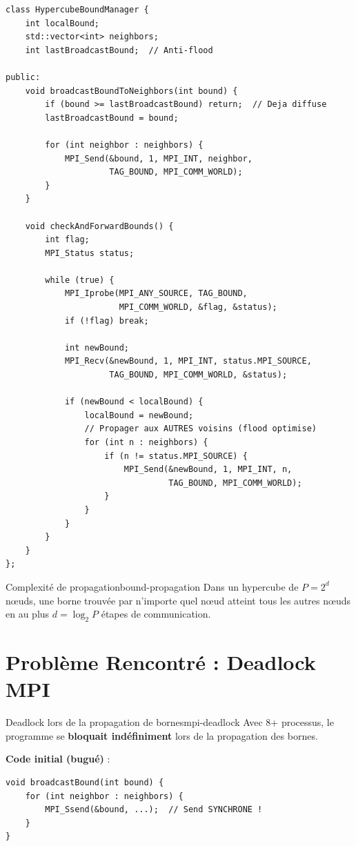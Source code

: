 \documentclass[12pt,a4paper,twoside]{report}
\begin{document}
\begin{lstlisting}[caption={Gestionnaire de bornes hypercube}]
class HypercubeBoundManager {
    int localBound;
    std::vector<int> neighbors;
    int lastBroadcastBound;  // Anti-flood

public:
    void broadcastBoundToNeighbors(int bound) {
        if (bound >= lastBroadcastBound) return;  // Deja diffuse
        lastBroadcastBound = bound;

        for (int neighbor : neighbors) {
            MPI_Send(&bound, 1, MPI_INT, neighbor,
                     TAG_BOUND, MPI_COMM_WORLD);
        }
    }

    void checkAndForwardBounds() {
        int flag;
        MPI_Status status;

        while (true) {
            MPI_Iprobe(MPI_ANY_SOURCE, TAG_BOUND,
                       MPI_COMM_WORLD, &flag, &status);
            if (!flag) break;

            int newBound;
            MPI_Recv(&newBound, 1, MPI_INT, status.MPI_SOURCE,
                     TAG_BOUND, MPI_COMM_WORLD, &status);

            if (newBound < localBound) {
                localBound = newBound;
                // Propager aux AUTRES voisins (flood optimise)
                for (int n : neighbors) {
                    if (n != status.MPI_SOURCE) {
                        MPI_Send(&newBound, 1, MPI_INT, n,
                                 TAG_BOUND, MPI_COMM_WORLD);
                    }
                }
            }
        }
    }
};
\end{lstlisting}

\begin{theoreme}{Complexité de propagation}{bound-propagation}
Dans un hypercube de $P = 2^d$ nœuds, une borne trouvée par n'importe quel nœud atteint tous les autres nœuds en au plus $d = \log_2 P$ étapes de communication.
\end{theoreme}

\section{Problème Rencontré : Deadlock MPI}

\begin{probleme}{Deadlock lors de la propagation de bornes}{mpi-deadlock}
Avec 8+ processus, le programme se \textbf{bloquait indéfiniment} lors de la propagation des bornes.

\textbf{Code initial (bugué)} :
\begin{lstlisting}
void broadcastBound(int bound) {
    for (int neighbor : neighbors) {
        MPI_Ssend(&bound, ...);  // Send SYNCHRONE !
    }
}
\end{lstlisting}
\end{probleme}
\end{document}
